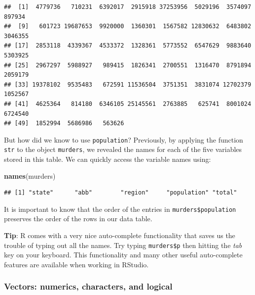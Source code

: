 \documentclass[
]{article}
\newenvironment{Shaded}{\begin{snugshade}}{\end{snugshade}}
\newcommand{\FunctionTok}[1]{\textcolor[rgb]{0.13,0.29,0.53}{\textbf{#1}}}
\newcommand{\NormalTok}[1]{#1}
\newcommand{\SpecialCharTok}[1]{\textcolor[rgb]{0.81,0.36,0.00}{\textbf{#1}}}
\begin{document}
\begin{Shaded}
\end{Shaded}

\begin{verbatim}
##  [1]  4779736   710231  6392017  2915918 37253956  5029196  3574097   897934
##  [9]   601723 19687653  9920000  1360301  1567582 12830632  6483802  3046355
## [17]  2853118  4339367  4533372  1328361  5773552  6547629  9883640  5303925
## [25]  2967297  5988927   989415  1826341  2700551  1316470  8791894  2059179
## [33] 19378102  9535483   672591 11536504  3751351  3831074 12702379  1052567
## [41]  4625364   814180  6346105 25145561  2763885   625741  8001024  6724540
## [49]  1852994  5686986   563626
\end{verbatim}

But how did we know to use \texttt{population}? Previously, by applying
the function \texttt{str} to the object \texttt{murders}, we revealed
the names for each of the five variables stored in this table. We can
quickly access the variable names using:

\begin{Shaded}
\begin{Highlighting}[]
\FunctionTok{names}\NormalTok{(murders)}
\end{Highlighting}
\end{Shaded}

\begin{verbatim}
## [1] "state"      "abb"        "region"     "population" "total"
\end{verbatim}

It is important to know that the order of the entries in
\texttt{murders\$population} preserves the order of the rows in our data
table.

\textbf{Tip}: R comes with a very nice auto-complete functionality that
saves us the trouble of typing out all the names. Try typing
\texttt{murders\$p} then hitting the \emph{tab} key on your keyboard.
This functionality and many other useful auto-complete features are
available when working in RStudio.

\subsubsection{Vectors: numerics, characters, and
logical}\label{vectors-numerics-characters-and-logical}
\end{document}
